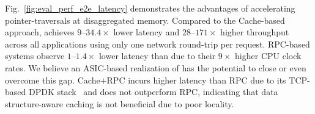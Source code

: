  Fig.~\ref{fig:eval_perf_e2e_latency} demonstrates the advantages of accelerating pointer-traversals at disaggregated memory. Compared to the Cache-based approach, \name achieves $9$--$34.4\times$ lower latency and $28$--$171\times$ higher throughput across all applications using only one network round-trip per request. RPC-based systems observe $1$--$1.4\times$ lower latency than \name due to their $9\times$ higher CPU clock rates. We believe an ASIC-based realization of \name has the potential to close or even overcome this gap. Cache$+$RPC incurs higher latency than RPC due to its TCP-based DPDK stack~\cite{ousterhout_shenango_19_nsdi, aifm} and does not outperform RPC, indicating that data structure-aware caching is not beneficial due to poor locality.


